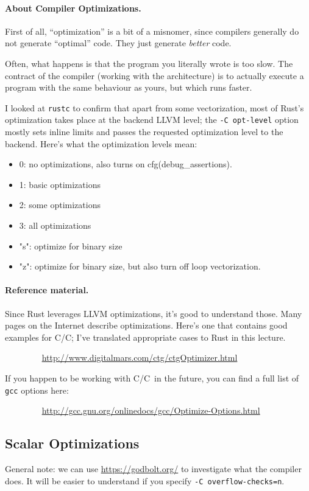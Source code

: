\documentclass[a4paper]{report}
\newcommand{\CPP}{C\nolinebreak\hspace{-.05em}\raisebox{.4ex}{\tiny\bf +}\nolinebreak\hspace{-.10em}\raisebox{.4ex}{\tiny\bf +}}
\def\CPP{{C\nolinebreak[4]\hspace{-.05em}\raisebox{.4ex}{\tiny\bf ++}}}
\begin{document}
\paragraph{About Compiler Optimizations.} First of all, ``optimization'' is
a bit of a misnomer, since compilers generally do not generate ``optimal'' code.
They just generate \emph{better} code.

Often, what happens is that the program you literally wrote is too slow. The
contract of the compiler (working with the architecture) is to actually execute
a program with the same behaviour as yours, but which runs faster.

I looked at \texttt{rustc} to confirm that apart from some vectorization, most of Rust's optimization takes place at the backend LLVM level; the \texttt{-C opt-level} option mostly sets inline limits and passes the requested optimization level to the backend. Here's what the optimization levels mean:

\begin{itemize}[noitemsep]
\item    0: no optimizations, also turns on cfg(debug\_assertions).
\item    1: basic optimizations
\item    2: some optimizations
\item     3: all optimizations
\item    "s": optimize for binary size
\item    "z": optimize for binary size, but also turn off loop vectorization.
\end{itemize}

\paragraph{Reference material.} Since Rust leverages LLVM optimizations, it's good to understand those. Many pages on the Internet describe
optimizations. Here's one that contains good examples for C/\CPP; I've translated appropriate cases to Rust in this lecture.

$\qquad \qquad$ \url{http://www.digitalmars.com/ctg/ctgOptimizer.html}

If you happen to be working with C/\CPP~in the future, you can find a full list of {\tt gcc} options here:

$\qquad \qquad$ \url{http://gcc.gnu.org/onlinedocs/gcc/Optimize-Options.html}

\subsection*{Scalar Optimizations}
General note: we can use \url{https://godbolt.org/} to investigate what the compiler does. It will be easier to understand if you specify \texttt{-C overflow-checks=n}.
\end{document}
